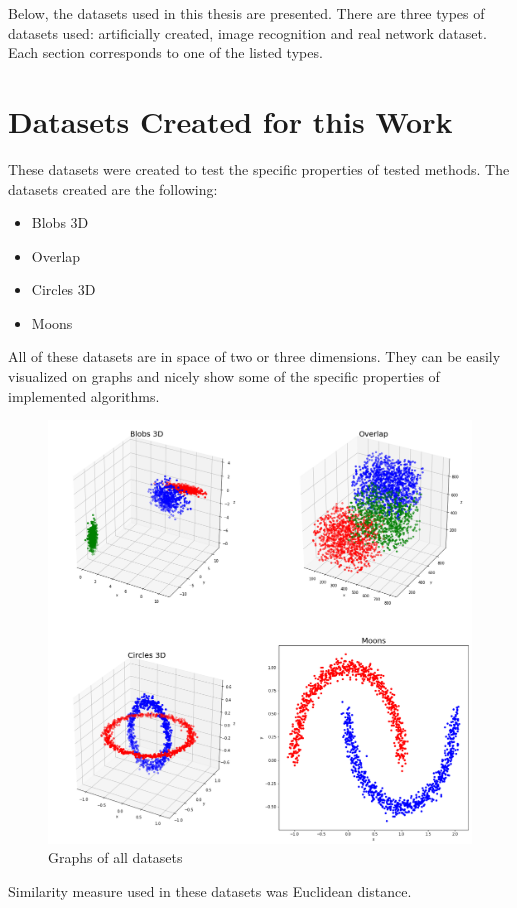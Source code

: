 \documentclass[thesis=B,english]{FITthesis}[2012/10/20]
\begin{document}
Below, the datasets used in this thesis are presented.
There are three types of datasets used: artificially created, image recognition and real network dataset.
Each section corresponds to one of the listed types.

\section{Datasets Created for this Work}

These datasets were created to test the specific properties of tested methods.
The datasets created are the following:
\begin{itemize}
    \item Blobs 3D
    \item Overlap
    \item Circles 3D
    \item Moons
\end{itemize}
All of these datasets are in space of two or three dimensions.
They can be easily visualized on graphs and nicely show some of the specific properties of implemented algorithms.
\begin{figure}
   \includegraphics[width=\linewidth]{img/datasets.png}
  \caption{Graphs of all datasets}
  \label{img:datasets}
\end{figure}
Similarity measure used in these datasets was Euclidean distance.
\end{document}
